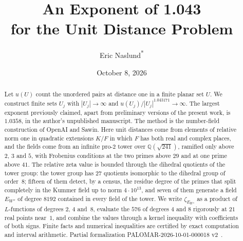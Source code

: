 \documentclass[11pt]{amsart}
\title[The Unit Distance Problem]{An Exponent of 1.043\\for the Unit Distance Problem}
\author[Eric Naslund]{Eric Naslund\textsuperscript{*}}
\date{October 8, 2026}
\numberwithin{equation}{section}
\theoremstyle{definition}
\theoremstyle{remark}
\newcommand{\Q}{\mathbb Q}
\begin{document}
\begin{abstract}
Let $u(U)$ count the unordered pairs at distance one in a finite planar
set $U$. We construct finite sets $U_j$ with $|U_j|\to\infty$ and
$u(U_j)/|U_j|^{1.043171}\to\infty$. The largest exponent previously
claimed, apart from preliminary versions of the present work, is $1.0358$,
in the author's unpublished manuscript. The
method is the number-field construction of OpenAI and Sawin. Here unit
distances come from elements of relative norm one in quadratic extensions
$K/F$ in which $F$ has both real and complex places, and the fields come
from an infinite pro-$2$ tower over $\Q(\sqrt{241})$, ramified only above
$2$, $3$ and $5$, with Frobenius conditions at the two primes above $29$
and at one prime above $41$. The relative zeta value is bounded through
the dihedral quotients of the tower group: the tower group has $27$ quotients
isomorphic to the dihedral group of order~$8$; fifteen of them detect, by
a census, the residue degree of the primes that split completely in the
Kummer field up to norm $4\cdot10^{13}$, and seven of them generate a
field $E_{W''}$ of degree $8192$ contained in every field of the tower. We
write $\zeta_{E_{W''}}$ as a product of $L$-functions of degrees $2$, $4$
and~$8$, evaluate the $576$ of degrees $4$ and $8$ rigorously at $21$ real points
near~$1$, and combine the values through a kernel inequality with
coefficients of both signs. Finite facts and numerical inequalities are
certified by exact computation and interval arithmetic. Partial
formalization PALOMAR-2026-10-01-000018 v2~\cite{NaslundLeanW}.
\end{abstract}
\maketitle
\end{document}
